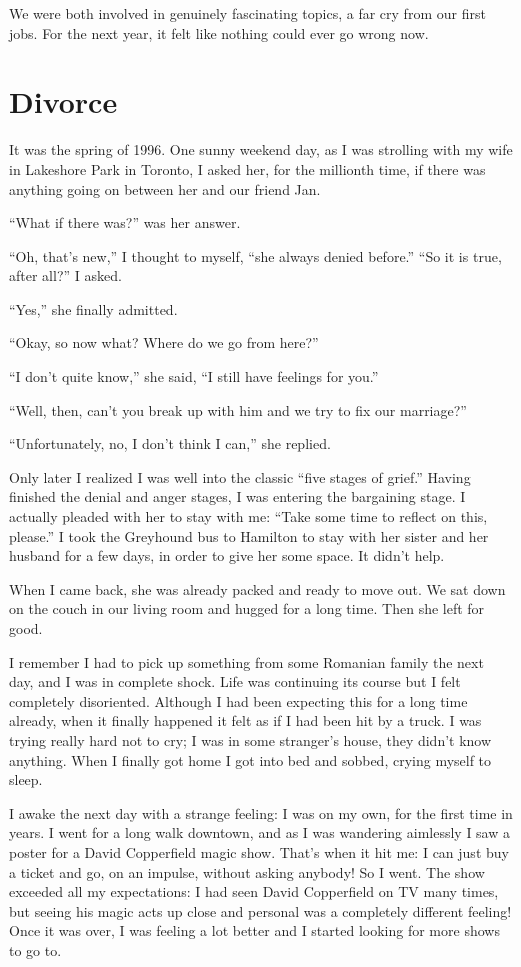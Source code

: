 \documentclass[12pt]{book}
\begin{document}
We were both involved in genuinely fascinating topics, a far cry from
our first jobs. For the next year, it felt like nothing could ever go
wrong now.


\section{Divorce}

It was the spring of 1996. One sunny weekend day, as I was strolling
with my wife in Lakeshore Park in Toronto, I asked her, for the
millionth time, if there was anything going on between her and our
friend Jan.

``What if there was?'' was her answer.

``Oh, that's new,'' I thought to myself, ``she always denied before.''
``So it is true, after all?'' I asked.

``Yes,'' she finally admitted.

``Okay, so now what? Where do we go from here?''

``I don't quite know,'' she said, ``I still have feelings for you.''

``Well, then, can't you break up with him and we try to fix our
marriage?''

``Unfortunately, no, I don't think I can,'' she replied.

Only later I realized I was well into the classic ``five stages of
grief.'' Having finished the denial and anger stages, I was entering the
bargaining stage. I actually pleaded with her to stay with me: ``Take
some time to reflect on this, please.'' I took the Greyhound bus to
Hamilton to stay with her sister and her husband for a few days, in
order to give her some space. It didn't help.

When I came back, she was already packed and ready to move out. We sat
down on the couch in our living room and hugged for a long time. Then
she left for good.

I remember I had to pick up something from some Romanian family the next
day, and I was in complete shock. Life was continuing its course but I
felt completely disoriented. Although I had been expecting this for a
long time already, when it finally happened it felt as if I had been hit
by a truck. I was trying really hard not to cry; I was in some
stranger's house, they didn't know anything. When I finally got home I
got into bed and sobbed, crying myself to sleep.

I awake the next day with a strange feeling: I was on my own, for the
first time in years. I went for a long walk downtown, and as I was
wandering aimlessly I saw a poster for a David Copperfield magic show.
That's when it hit me: I can just buy a ticket and go, on an impulse,
without asking anybody! So I went. The show exceeded all my
expectations: I had seen David Copperfield on TV many times, but seeing
his magic acts up close and personal was a completely different feeling!
Once it was over, I was feeling a lot better and I started looking for
more shows to go to.
\end{document}

